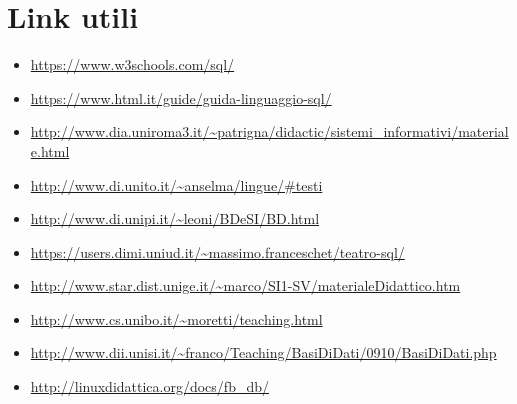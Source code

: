 \documentclass[a4paper]{article}
\begin{document}
\section{Link utili}
\begin{itemize}[leftmargin=*]
  \item \url{https://www.w3schools.com/sql/}
  \item \url{https://www.html.it/guide/guida-linguaggio-sql/}
  \item \url{http://www.dia.uniroma3.it/~patrigna/didactic/sistemi_informativi/materiale.html}
  \item \url{http://www.di.unito.it/~anselma/lingue/#testi}
  \item \url{http://www.di.unipi.it/~leoni/BDeSI/BD.html}
  \item \url{https://users.dimi.uniud.it/~massimo.franceschet/teatro-sql/}
  \item \url{http://www.star.dist.unige.it/~marco/SI1-SV/materialeDidattico.htm}
  \item \url{http://www.cs.unibo.it/~moretti/teaching.html}
  \item \url{http://www.dii.unisi.it/~franco/Teaching/BasiDiDati/0910/BasiDiDati.php}
  \item \url{http://linuxdidattica.org/docs/fb_db/}
\end{itemize}
\end{document}
